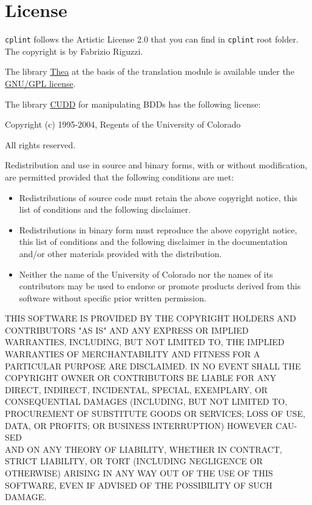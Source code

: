 \documentclass[a4paper,10pt]{scrartcl}
\begin{document}
\section{License}
\label{license}



\texttt{cplint} follows the Artistic License 2.0 that you can find in \texttt{cplint} root folder. The copyright is by Fabrizio Riguzzi.
\vspace{3mm}

The library \href{http://vangelisv.github.io/thea/}{Thea} at the basis of the translation module is available under the \href{http://www.gnu.org/copyleft/gpl.html}{GNU/GPL license}.

The library \href{http://vlsi.colorado.edu/\string ~fabio/}{CUDD} for manipulating BDDs has the following license:

\vspace{3mm}

Copyright (c) 1995-2004, Regents of the University of Colorado

All rights reserved.

Redistribution and use in source and binary forms, with or without
modification, are permitted provided that the following conditions
are met:

\begin{itemize}
\item
Redistributions of source code must retain the above copyright
notice, this list of conditions and the following disclaimer.
\item
Redistributions in binary form must reproduce the above copyright
notice, this list of conditions and the following disclaimer in the
documentation and/or other materials provided with the distribution.
\item
Neither the name of the University of Colorado nor the names of its
contributors may be used to endorse or promote products derived from
this software without specific prior written permission.
\end{itemize}
THIS SOFTWARE IS PROVIDED BY THE COPYRIGHT HOLDERS AND CONTRIBUTORS
"AS IS" AND ANY EXPRESS OR IMPLIED WARRAN\-TIES, INCLUDING, BUT NOT
LIMITED TO, THE IMPLIED WARRANTIES OF MERCHANTABILITY AND FITNESS
FOR A PARTICULAR PURPOSE ARE DISCLAIMED. IN NO EVENT SHALL THE
COPYRIGHT OWNER OR CONTRIBUTORS BE LIABLE FOR ANY DIRECT, INDIRECT,
INCIDENTAL, SPECIAL, EXEMPLARY, OR CONSEQUENTIAL DAMAGES (INCLUDING,
BUT NOT LIMITED TO, PROCUREMENT OF SUBSTITUTE GOODS OR SERVICES;
LOSS OF USE, DATA, OR PROFITS; OR BUSINESS INTERRUPTION) HOWEVER
CAU-SED
\\ AND ON ANY THEORY OF LIABILITY, WHETHER IN CONTRACT, STRICT
LIABILITY, OR TORT (INCLUDING NEGLIGENCE OR OTHERWISE) ARISING IN
ANY WAY OUT OF THE USE OF THIS SOFTWARE, EVEN IF ADVISED OF THE
POSSIBILITY OF SUCH DAMAGE.




\end{document}
